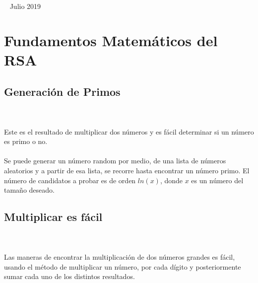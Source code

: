 \documentclass[12pt, a4paper]{article}
\begin{document}
\begin{titlepage}

		\vfill\ %
		{\large Julio 2019} %




		\vfill %

	\end{titlepage}

	\section{Fundamentos Matemáticos del RSA}
	\subsection{Generación de Primos}
	\\
	\\Este es el resultado de multiplicar dos números y es fácil determinar si un número es primo o no.
	\\
	\\Se puede generar un número random por medio, de una lista de números aleatorios y a partir de esa lista, se recorre hasta encontrar un número primo. El número de candidatos a probar es de orden $ln(x)$, donde $x$ es un número del tamaño deseado.

	\subsection{Multiplicar es fácil}
	\\
	\\ Las maneras de encontrar la multiplicación de dos números grandes es fácil, usando el método de multiplicar un número, por cada dígito y posteriormente sumar cada uno de los distintos resultados.
\end{document}
